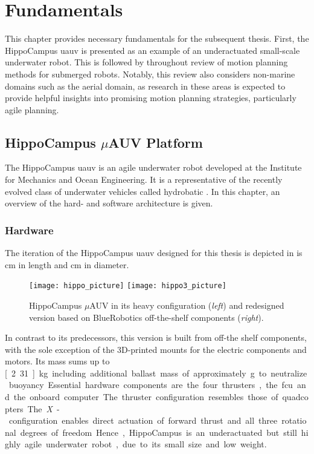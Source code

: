 \chapter{Fundamentals}\label{chap:fundamentals}
This chapter provides necessary fundamentals for the subsequent thesis.
First, the HippoCampus \ac{uauv} is presented as an example of an underactuated small-scale underwater robot.
This is followed by throughout review of motion planning methods for submerged robots.
Notably, this review also considers non-marine domains such as the aerial domain, as research in these areas is expected to provide helpful insights into promising motion planning strategies, particularly agile planning.

\section{HippoCampus $\mu$AUV Platform}\label{sec:hippo-platform}

The HippoCampus \ac{uauv} is an agile underwater robot developed at the Institute for Mechanics and Ocean Engineering. It is a representative of the recently evolved class of underwater vehicles called hydrobatic \cite{hydrobatic}. In this chapter, an overview of the hard- and software architecture is given.

\subsection{Hardware}
The iteration of the HippoCampus \ac{uauv} designed for this thesis is depicted in  is \unit[30]{cm} in length and \unit[8]{cm} in diameter.
\begin{figure}[h!]
    \centering
    \texttt{[image: hippo\_picture]}
    \quad\quad
    \texttt{[image: hippo3\_picture]}
    \caption{HippoCampus $\mu$AUV in its heavy configuration (\textit{left}) and redesigned version based on BlueRobotics off-the-shelf components (\textit{right}).}
    \label{fig:new-vehicle-design}
\end{figure}
In contrast to its predecessors, this version is built from off-the shelf components, with the sole exception of the 3D-printed mounts for the electric components and motors. 
Its mass sums up to \unit[2.31]{kg} including additional ballast mass of approximately \unit[150]{g} to neutralize buoyancy.

Essential hardware components are the four thrusters, the \ac{fcu} and the onboard computer. The thruster configuration resembles those of quadcopters. The \textit{X}-configuration enables direct actuation of forward thrust and all three rotational degrees of freedom. Hence, HippoCampus is an underactuated but still highly agile underwater robot, due to its small size and low weight.

